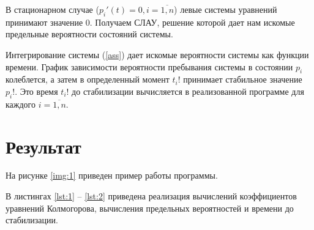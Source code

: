 \documentclass[a4paper, 14pt, unknownkeysallowed]{extreport}
\begin{document}
В стационарном случае ($p_i'(t) = 0, i = \overline{1, n}$) левые системы уравнений принимают значение 0. Получаем СЛАУ, решение которой дает нам искомые предельные вероятности состояний системы. 

Интегрирование системы (\ref{ass}) дает искомые вероятности системы как функции времени. 
График зависимости вероятности пребывания системы в состоянии $p_i$ колеблется, а затем в определенный момент $t_i!$ принимает стабильное значение $p_i!$. Это время $t_i!$ до стабилизации вычисляется в реализованной программе для каждого $i = \overline{1, n}$.

\chapter{Результат}
На рисунке \ref{img:1} приведен пример работы программы.

В листингах \ref{lst:1} -- \ref{lst:2} приведена реализация вычислений коэффициентов уравнений Колмогорова, вычисления предельных вероятностей и времени до стабилизации.
\end{document}

